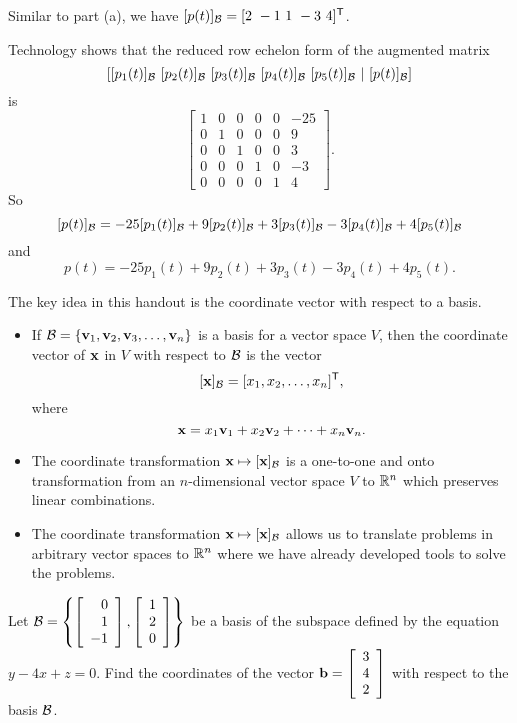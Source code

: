 \begin{example}
	\item Similar to part (a), we have $[p(t)]_{\mathcal{B}} = [2 \ -1 \ 1 \ -3 \ 4]^{\mathsf{T}}$. 
	
	\item Technology shows that the reduced row echelon form of the augmented matrix 
	\[[[p_1(t)]_{\CB} \ [p_2(t)]_{\CB} \ [p_3(t)]_{\CB} \ [p_4(t)]_{\CB} \ [p_5(t)]_{\CB} \ | \ [p(t)]_{\CB}]\] 
	is 
	\[\left[ \begin{array}{ccccc|r} 1&0&0&0&0&-25 \\ 0&1&0&0&0& 9 \\ 0&0&1&0&0&3 \\ 0&0&0&1&0&-3 \\ 0&0&0&0&1&4\end{array} \right].\]
	So 
	\[[p(t)]_{\mathcal{B}} = -25[p_1(t)]_{\mathcal{B}} +  9[p_2(t)]_{\mathcal{B}} + 3[p_3(t)]_{\mathcal{B}} - 3[p_4(t)]_{\mathcal{B}} +  4[p_5(t)]_{\mathcal{B}}\]
	and 
	\[p(t) = -25p_1(t) + 9p_2(t) + 3p_3(t) - 3p_4(t) + 4p_5(t).\]
	 
	\ea
	
\end{example}


\label{sec:coord_vec_summ}

The key idea in this handout is the coordinate vector with respect to a basis.

\begin{itemize}
\item If $\mathcal{B} = \{\mathbf{v}_1, \mathbf{v}_2, \mathbf{v}_3, \ldots, \mathbf{v}_n\}$ is a basis for a vector space $V$, then the coordinate vector of $\mathbf{x}$ in $V$ with respect to $\mathcal{B}$ is the vector
\[[\mathbf{x}]_{\mathcal{B}} = [x_1, x_2, \ldots, x_n]^{\mathsf{T}},\]
where
\[\mathbf{x} = x_1 \mathbf{v}_1 + x_2 \mathbf{v}_2 + \cdots + x_n \mathbf{v}_n.\]
\item The coordinate transformation $\mathbf{x} \mapsto [\mathbf{x}]_{\mathcal{B}}$ is a one-to-one and onto transformation from an $n$-dimensional vector space $V$ to $\mathbb{R}^n$ which preserves linear combinations.
\item The coordinate transformation $\mathbf{x} \mapsto [\mathbf{x}]_{\mathcal{B}}$ allows us to translate problems in arbitrary vector spaces to $\mathbb{R}^n$ where we have already developed tools to solve the problems.
\end{itemize}


\label{sec:coord_vec_exer}

\be
\item Let $\mathcal{B}=\left\{ \left[ \begin{array}{r} 0\\1\\-1 \end{array} \right], \left[ \begin{array}{c} 1\\2\\0 \end{array} \right] \right\}$ be a basis of the subspace defined by the equation $y-4x+z=0$. Find the coordinates of the vector $\mathbf{b}=\left[ \begin{array}{c} 3\\4\\2 \end{array} \right]$ with respect to the basis $\mathcal{B}$. 
 

